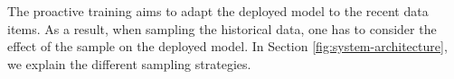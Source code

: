 The proactive training aims to adapt the deployed model to the recent data items.
As a result, when sampling the historical data, one has to consider the effect of the sample on the deployed model.
In Section \ref{fig:system-architecture}, we explain the different sampling strategies.
